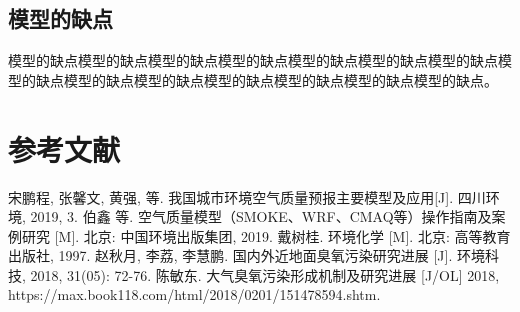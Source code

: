 \documentclass[bwprint]{gmcmthesis}
\numberwithin{figure}{section}
\begin{document}
\subsection{模型的缺点}
模型的缺点模型的缺点模型的缺点模型的缺点模型的缺点模型的缺点模型的缺点模型的缺点模型的缺点模型的缺点模型的缺点模型的缺点模型的缺点模型的缺点。









%

\section{参考文献}
\begin{thebibliography}{1.2}%
\setlength{\itemsep}{-2mm}
 宋鹏程, 张馨文, 黄强, 等. 我国城市环境空气质量预报主要模型及应用[J]. 四川环境, 2019, 3.
 伯鑫 等. 空气质量模型（SMOKE、WRF、CMAQ等）操作指南及案例研究 [M]. 北京: 中国环境出版集团, 2019.
 戴树桂. 环境化学 [M]. 北京: 高等教育出版社, 1997.
 赵秋月, 李荔, 李慧鹏. 国内外近地面臭氧污染研究进展 [J]. 环境科技, 2018, 31(05): 72-76.
 陈敏东. 大气臭氧污染形成机制及研究进展 [J/OL] 2018, https://max.book118.com/html/2018/0201/151478594.shtm. 
\end{thebibliography}
\end{document}
